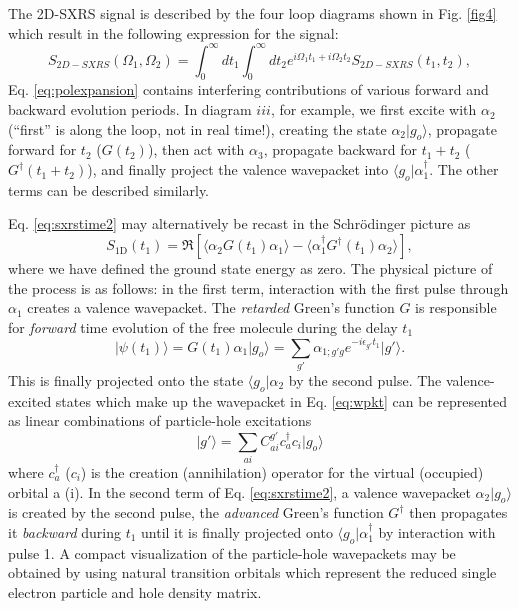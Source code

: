 \documentclass{ar-1col}
\begin{document}
\begin{marginnote}
\end{marginnote}

The 2D-SXRS signal is described by the four loop diagrams shown in
Fig. \ref{fig4} which result in the following expression for the signal:
\begin{equation}
S_{2D-SXRS}(\Omega_1,\Omega_2)= \int_{0}^\infty dt_1  \int_{0}^\infty dt_2  e^{i \Omega_1 t_1+i \Omega_2 t_2}S_{2D-SXRS}(t_1,t_2),
\end{equation}
Eq. \ref{eq:polexpansion} contains interfering contributions of various forward and backward
evolution periods.  In diagram $iii$, for example, we first excite
with $\alpha_2$ (``first'' is along the loop, not in real time!),
creating the state $\alpha_2 \vert g_o \rangle$, propagate forward for
$t_2$ ($G(t_2)$), then act with $\alpha_3$, propagate backward for
$t_1+t_2$ ($G^{\dagger}(t_1+t_2)$), and finally project the valence
wavepacket into $\langle g_o \vert \alpha_1^\dagger$.  The other terms can be described
similarly.


Eq. \ref{eq:sxrstime2} may alternatively be recast in the
Schr\"{o}dinger picture as
\begin{equation}\label{eq:sxrstime2}
  S_{\textrm{1D}}(t_1) = \Re \left[\langle\alpha_2 G(t_1)\alpha_1 \rangle - \langle \alpha^\dagger_1 G^\dagger(t_1) \alpha_2\rangle\right],
\end{equation}
where we have defined the ground state energy as zero.  The physical
picture of the process is as follows: in the first term, interaction
with the first pulse through $\alpha_1$ creates a valence
wavepacket. The \emph{retarded} Green's function $G$ is responsible
for \emph{forward} time evolution of the free molecule during the
delay $t_1$
\begin{equation}\label{eq:wpkt}
  \vert \psi( t_1 ) \rangle = G(t_1) \alpha_1 \vert g_o \rangle = \sum_{g'} \alpha_{1;g' g} e^{-i \epsilon_{g'} t_1 }\vert g' \rangle.
\end{equation}
This is finally projected onto the state $\langle g_o \vert \alpha_2$ by the second pulse.  The
valence-excited states which make up the wavepacket in
Eq. \ref{eq:wpkt} can be represented as linear combinations of
particle-hole excitations
\begin{equation}
  \vert g' \rangle = \sum_{ai} C^{g'}_{ai} c^{\dagger}_a c_i \vert g_o \rangle
\end{equation}
where $c^{\dagger}_a$ ($c_i$) is the creation (annihilation) operator
for the virtual (occupied) orbital a (i).  In the second term of Eq. \ref{eq:sxrstime2}, a valence wavepacket
$\alpha_2 \vert g_o \rangle$ is created by the second pulse, the
\emph{advanced} Green's function $G^\dagger$ then propagates it
\emph{backward} during $t_1$ until it is finally projected onto
$\langle g_o \vert \alpha_1^\dagger$ by interaction with pulse 1.
A compact visualization of the particle-hole wavepackets may be obtained by
using natural transition orbitals which represent the reduced single electron particle
and hole density matrix.
\end{document}
